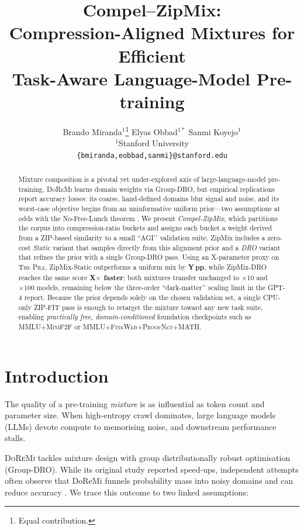 \documentclass{article}
\title{Compel--ZipMix:\\
Compression-Aligned Mixtures for Efficient\\
Task-Aware Language-Model Pre-training}
\author{Brando Miranda$^{1}$\thanks{Equal contribution.}\;
        Elyas Obbad$^{1*}$\;
        Sanmi Koyejo$^{1}$\\
        $^{1}$Stanford University \\
        \texttt{\{bmiranda,eobbad,sanmi\}@stanford.edu}
}
\begin{document}
\maketitle

\begin{abstract}
Mixture composition is a pivotal yet under-explored axis of
large-language-model pre-training.  
\textsc{DoReMi} learns domain weights via Group-DRO, but empirical
replications report accuracy losses: its coarse, hand-defined domains
blur signal and noise, and its worst-case objective begins from an
uninformative uniform prior—two assumptions at odds with the
No-Free-Lunch theorem \citep{wolpert1997no}.  
We present \emph{Compel-ZipMix}, which partitions the corpus into
compression-ratio buckets and assigns each bucket a weight derived from a
ZIP-based similarity to a small “AGI’’ validation suite.  
ZipMix includes a zero-cost \emph{Static} variant that samples directly
from this alignment prior and a \emph{DRO} variant that refines the prior
with a single Group-DRO pass.  
Using an X-parameter proxy on \textsc{The Pile},
ZipMix-Static outperforms a uniform mix by \textbf{Y\,pp}, while
ZipMix-DRO reaches the same score \textbf{X$\times$ faster};
both mixtures transfer unchanged to $\times10$ and $\times100$ models,
remaining below the three-order “dark-matter’’ scaling limit in the GPT-4
report.  
Because the prior depends solely on the chosen validation set, a single
CPU-only ZIP-FIT pass is enough to retarget the mixture toward any new
task suite, enabling \emph{practically free, domain-conditioned}
foundation checkpoints such as \textsc{MMLU+MiniF2F} or
\textsc{MMLU+FineWeb+ProofNet+MATH}.
\end{abstract}

\section{Introduction}\label{sec:intro}

The quality of a pre-training \emph{mixture} is as influential as token
count and parameter size.  
When high-entropy crawl dominates, large language models (LLMs) devote
compute to memorising noise, and downstream performance stalls.

\textsc{DoReMi} tackles mixture design with group distributionally robust
optimisation (Group-DRO).  
While its original study reported speed-ups, independent attempts often
observe that DoReMi funnels probability mass into noisy domains and can
reduce accuracy \citep{fan2023doge}.  
We trace this outcome to two linked assumptions:
\end{document}
